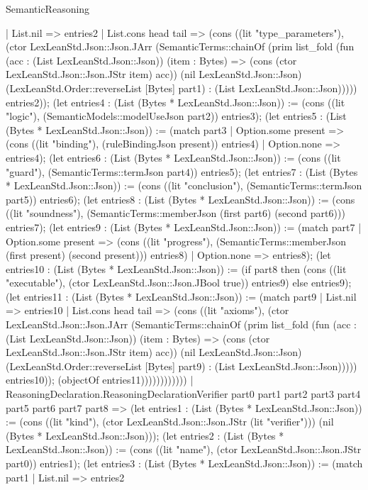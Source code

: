 \begin{lexlean}{SemanticReasoning}
\begin{semanticmodule}
{      | List.nil => entries2
      | List.cons head tail => (cons ((lit "type_parameters"), (ctor LexLeanStd.Json::Json.JArr (SemanticTerms::chainOf (prim list_fold (fun (acc : (List LexLeanStd.Json::Json)) (item : Bytes) => (cons (ctor LexLeanStd.Json::Json.JStr item) acc)) (nil LexLeanStd.Json::Json) (LexLeanStd.Order::reverseList [Bytes] part1) : (List LexLeanStd.Json::Json))))) entries2)); (let entries4 : (List (Bytes * LexLeanStd.Json::Json)) := (cons ((lit "logic"), (SemanticModels::modelUseJson part2)) entries3); (let entries5 : (List (Bytes * LexLeanStd.Json::Json)) := (match part3
      | Option.some present => (cons ((lit "binding"), (ruleBindingJson present)) entries4)
      | Option.none => entries4); (let entries6 : (List (Bytes * LexLeanStd.Json::Json)) := (cons ((lit "guard"), (SemanticTerms::termJson part4)) entries5); (let entries7 : (List (Bytes * LexLeanStd.Json::Json)) := (cons ((lit "conclusion"), (SemanticTerms::termJson part5)) entries6); (let entries8 : (List (Bytes * LexLeanStd.Json::Json)) := (cons ((lit "soundness"), (SemanticTerms::memberJson (first part6) (second part6))) entries7); (let entries9 : (List (Bytes * LexLeanStd.Json::Json)) := (match part7
      | Option.some present => (cons ((lit "progress"), (SemanticTerms::memberJson (first present) (second present))) entries8)
      | Option.none => entries8); (let entries10 : (List (Bytes * LexLeanStd.Json::Json)) := (if part8 then (cons ((lit "executable"), (ctor LexLeanStd.Json::Json.JBool true)) entries9) else entries9); (let entries11 : (List (Bytes * LexLeanStd.Json::Json)) := (match part9
      | List.nil => entries10
      | List.cons head tail => (cons ((lit "axioms"), (ctor LexLeanStd.Json::Json.JArr (SemanticTerms::chainOf (prim list_fold (fun (acc : (List LexLeanStd.Json::Json)) (item : Bytes) => (cons (ctor LexLeanStd.Json::Json.JStr item) acc)) (nil LexLeanStd.Json::Json) (LexLeanStd.Order::reverseList [Bytes] part9) : (List LexLeanStd.Json::Json))))) entries10)); (objectOf entries11))))))))))))
    | ReasoningDeclaration.ReasoningDeclarationVerifier part0 part1 part2 part3 part4 part5 part6 part7 part8 => (let entries1 : (List (Bytes * LexLeanStd.Json::Json)) := (cons ((lit "kind"), (ctor LexLeanStd.Json::Json.JStr (lit "verifier"))) (nil (Bytes * LexLeanStd.Json::Json))); (let entries2 : (List (Bytes * LexLeanStd.Json::Json)) := (cons ((lit "name"), (ctor LexLeanStd.Json::Json.JStr part0)) entries1); (let entries3 : (List (Bytes * LexLeanStd.Json::Json)) := (match part1
      | List.nil => entries2
}
\end{semanticmodule}
\end{lexlean}
